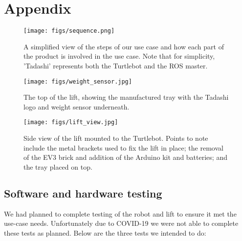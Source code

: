 \documentclass{article}
\begin{document}
\newpage
\section{Appendix}
\begin{figure}
  \begin{center}
    \texttt{[image: figs/sequence.png]}
  \end{center}
  \caption{A simplified view of the steps of our use case and how each part of the product is involved in the use case. Note that for simplicity, 'Tadashi' represents both the Turtlebot and the ROS master.}
  \label{fig:seq}
\end{figure}
\begin{figure}
  \begin{center}
    \texttt{[image: figs/weight\_sensor.jpg]}
    \caption{The top of the lift, showing the manufactured tray with the Tadashi logo and weight sensor underneath.}
  \label{fig:sensor}
  \end{center}
\end{figure}

\begin{figure}
  \begin{center}
    \texttt{[image: figs/lift\_view.jpg]}
    \caption{Side view of the lift mounted to the Turtlebot. Points to note include the metal brackets used to fix the lift in place; the removal of the EV3 brick and addition of the Arduino kit and batteries; and the tray placed on top.}
  \label{fig:lift}
  \end{center}
\end{figure}

\subsection{Software and hardware testing}
We had planned to complete testing of the robot and lift to ensure it met the use-case needs. Unfortunately due to COVID-19 we were not able to complete these tests as planned. Below are the three tests we intended to do:
\end{document}
